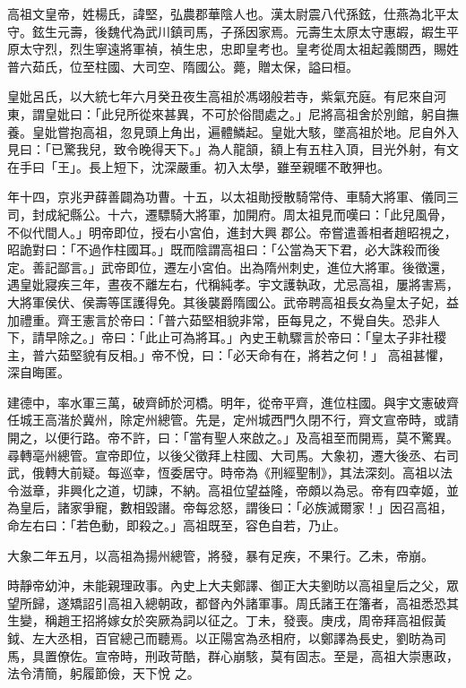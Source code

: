 
\begin{pinyinscope}

 高祖文皇帝，姓楊氏，諱堅，弘農郡華陰人也。漢太尉震八代孫鉉，仕燕為北平太守。鉉生元壽，後魏代為武川鎮司馬，子孫因家焉。元壽生太原太守惠嘏，嘏生平原太守烈，烈生寧遠將軍禎，禎生忠，忠即皇考也。皇考從周太祖起義關西，賜姓普六茹氏，位至柱國、大司空、隋國公。薨，贈太保，謚曰桓。



 皇妣呂氏，以大統七年六月癸丑夜生高祖於馮翊般若寺，紫氣充庭。有尼來自河東，謂皇妣曰：「此兒所從來甚異，不可於俗間處之。」尼將高祖舍於別館，躬自撫養。皇妣嘗抱高祖，忽見頭上角出，遍體鱗起。皇妣大駭，墜高祖於地。尼自外入見曰：「已驚我兒，致令晚得天下。」為人龍頷，額上有五柱入頂，目光外射，有文在手曰「王」。長上短下，沈深嚴重。初入太學，雖至親暱不敢狎也。



 年十四，京兆尹薛善闢為功曹。十五，以太祖勛授散騎常侍、車騎大將軍、儀同三司，封成紀縣公。十六，遷驃騎大將軍，加開府。周太祖見而嘆曰：「此兒風骨，不似代間人。」明帝即位，授右小宮伯，進封大興
 郡公。帝嘗遣善相者趙昭視之，昭詭對曰：「不過作柱國耳。」既而陰謂高祖曰：「公當為天下君，必大誅殺而後定。善記鄙言。」武帝即位，遷左小宮伯。出為隋州刺史，進位大將軍。後徵還，遇皇妣寢疾三年，晝夜不離左右，代稱純孝。宇文護執政，尤忌高祖，屢將害焉，大將軍侯伏、侯壽等匡護得免。其後襲爵隋國公。武帝聘高祖長女為皇太子妃，益加禮重。齊王憲言於帝曰：「普六茹堅相貌非常，臣每見之，不覺自失。恐非人下，請早除之。」帝曰：「此止可為將耳。」內史王軌驟言於帝曰：「皇太子非社稷主，普六茹堅貌有反相。」帝不悅，曰：「必天命有在，將若之何！」
 高祖甚懼，深自晦匿。



 建德中，率水軍三萬，破齊師於河橋。明年，從帝平齊，進位柱國。與宇文憲破齊任城王高湝於冀州，除定州總管。先是，定州城西門久閉不行，齊文宣帝時，或請開之，以便行路。帝不許，曰：「當有聖人來啟之。」及高祖至而開焉，莫不驚異。尋轉亳州總管。宣帝即位，以後父徵拜上柱國、大司馬。大象初，遷大後丞、右司武，俄轉大前疑。每巡幸，恆委居守。時帝為《刑經聖制》，其法深刻。高祖以法令滋章，非興化之道，切諫，不納。高祖位望益隆，帝頗以為忌。帝有四幸姬，並為皇后，諸家爭寵，數相毀譖。帝每忿怒，謂後曰：「必族滅爾家！」因召高祖，
 命左右曰：「若色動，即殺之。」高祖既至，容色自若，乃止。



 大象二年五月，以高祖為揚州總管，將發，暴有足疾，不果行。乙未，帝崩。



 時靜帝幼沖，未能親理政事。內史上大夫鄭譯、御正大夫劉昉以高祖皇后之父，眾望所歸，遂矯詔引高祖入總朝政，都督內外諸軍事。周氏諸王在籓者，高祖悉恐其生變，稱趙王招將嫁女於突厥為詞以征之。丁未，發喪。庚戌，周帝拜高祖假黃鉞、左大丞相，百官總己而聽焉。以正陽宮為丞相府，以鄭譯為長史，劉昉為司馬，具置僚佐。宣帝時，刑政苛酷，群心崩駭，莫有固志。至是，高祖大崇惠政，法令清簡，躬履節儉，天下悅
 之。




\end{pinyinscope}

